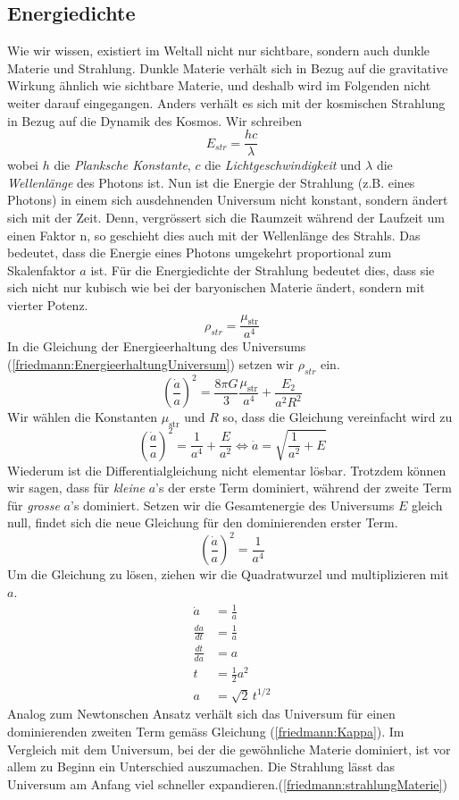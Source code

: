 \begin{refsection}
\subsection*{Energiedichte}
Wie wir wissen, existiert im Weltall nicht nur sichtbare, sondern auch dunkle Materie und Strahlung. Dunkle Materie verhält sich in Bezug auf die gravitative Wirkung ähnlich wie sichtbare Materie, und deshalb wird im Folgenden nicht weiter darauf eingegangen.
Anders verhält es sich mit der kosmischen Strahlung in Bezug auf die Dynamik des Kosmos. Wir schreiben
\[ E_{str} = \frac{h c}{\lambda} \]
wobei $h$ die {\em Planksche Konstante}, $c$ die {\em Lichtgeschwindigkeit} und $\lambda$ die {\em Wellenlänge} des Photons ist.
Nun ist die Energie der Strahlung (z.B. eines Photons) in einem sich ausdehnenden Universum nicht konstant, sondern ändert sich mit der Zeit. 
Denn, vergrössert sich die Raumzeit während der Laufzeit um einen Faktor n, so geschieht dies auch mit der Wellenlänge des Strahls. Das bedeutet, dass die Energie eines Photons umgekehrt proportional zum Skalenfaktor $a$ ist. Für die Energiedichte der Strahlung bedeutet dies, dass sie sich nicht nur kubisch wie bei der baryonischen Materie ändert, sondern mit vierter Potenz.
\begin{equation}
\rho_{str} = \frac{\mu_{\text{str}}}{a^4}
\end{equation}
In die Gleichung der Energieerhaltung des Universums (\ref{friedmann:EnergieerhaltungUniversum}) setzen wir $\rho_{str}$ ein.
\[\left(\frac{\dot{a}}{a} \right)^2 = \frac{8 \pi G}{3} \frac{\mu_{\text{str}}}{a^4} + \frac{E_2}{a^2 R^2}\]
Wir wählen die Konstanten $\mu_{\text{str}}$ und $R$ so, dass die Gleichung vereinfacht wird zu
\[\left(\frac{\dot{a}}{a} \right)^2 = \frac{1}{a^4} + \frac{E}{a^2} \Leftrightarrow \dot{a} = \sqrt{\frac{1}{a^2} + E}\]
Wiederum ist die Differentialgleichung nicht elementar lösbar. Trotzdem können wir sagen, dass für {\em kleine} $a$'s der erste Term dominiert, während der zweite Term für {\em grosse} $a$'s dominiert. Setzen wir die Gesamtenergie des Universums $E$ gleich null, findet sich die neue Gleichung für den dominierenden erster Term.	
\[\left(\frac{\dot{a}}{a} \right)^2 = \frac{1}{a^4}\]
Um die Gleichung zu lösen, ziehen wir die Quadratwurzel und multiplizieren mit $a$.
\begin{align}
	\nonumber\dot{a} &= \frac{1}{a} \\
	\nonumber\frac{da}{dt} &=\frac{1}{a} \\
	\nonumber\frac{dt}{da} &= a\\
	\nonumber t &= \frac{1}{2} a^{2}\\
	a &= \sqrt{2}\,t^{1/2} 
\end{align}
Analog zum Newtonschen Ansatz verhält sich das Universum für einen dominierenden zweiten Term gemäss Gleichung (\ref{friedmann:Kappa}). 
Im Vergleich mit dem Universum, bei der die gewöhnliche Materie dominiert, ist vor allem zu Beginn ein Unterschied auszumachen. Die Strahlung lässt das Universum am Anfang viel schneller expandieren.(\ref{friedmann:strahlungMaterie}) 


\end{refsection}
